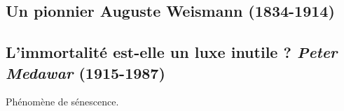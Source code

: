 \subsection{Un pionnier Auguste Weismann (1834-1914)}

\subsection{L'immortalité est-elle un luxe inutile ? \textit{Peter Medawar} (1915-1987)}

	Phénomène de sénescence.
